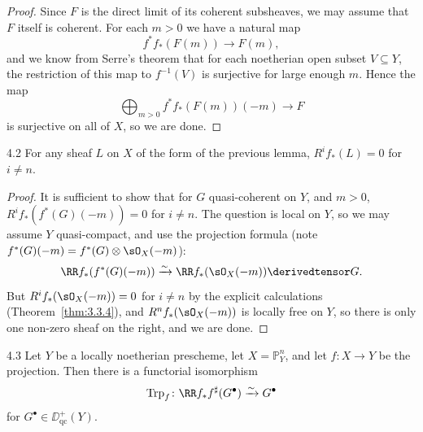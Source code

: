 \begin{proof}
Since $F$ is the direct limit of its coherent subsheaves, we may assume that $F$ itself is coherent. For each $m>0$ we have a natural map
\[
f^*f_*(F(m)) \longrightarrow F(m),
\]
and we know from Serre's theorem \cite[\nopp III,~2.2.1]{EGA} that for each noetherian open subset $V\subseteq Y$, the restriction of this map to $f^{-1}(V)$ is surjective for large enough $m$. Hence the map
\[
\bigoplus_{m>0} f^*f_*(F(m))(-m) \longrightarrow F
\]
is surjective on all of $X$, so we are done.
\end{proof}

\begin{booklemma}{4.2}\label{lem:3.4.2}
For any sheaf $L$ on $X$ of the form of the previous lemma, $R^i f_*(L)=0$ for $i\neq n$.
\end{booklemma}

\begin{proof}
It is sufficient to show that for $G$ quasi-coherent on $Y$, and $m>0$, $R^i f_*(f^*(G)(-m))=0$ for $i\neq n$. The question is local on $Y$, so we may assume $Y$ quasi-compact, and use the projection formula  (note $f^*(G)(-m)=f^*(G)\otimes\sO_X(-m)$):
\[
\RR f_*(f^*(G)(-m)) \xrightarrow{\sim} \RR f_*(\sO_X(-m))\derivedtensor G.
\]
But $R^i f_*(\sO_X(-m))=0$ for $i\neq n$ by the explicit calculations (Theorem~\ref{thm:3.3.4}), and $R^n f_*(\sO_X(-m))$ is locally free on $Y$, so there is only one non-zero sheaf on the right, and we are done.
\end{proof}

\begin{bookproposition}{4.3}\label{prop:3.4.3}
Let $Y$ be a locally noetherian prescheme, let $X=\mathbb{P}^n_Y$, and let $f\colon X\to Y$ be the projection. Then there is a functorial isomorphism
\[
\operatorname{Trp}_f \colon \RR f_* f^{\sharp}(G^\bullet) \xrightarrow{\sim} G^\bullet
\]
for $G^\bullet\in\DD_{\mathrm{qc}}^+(Y)$.
\end{bookproposition}

